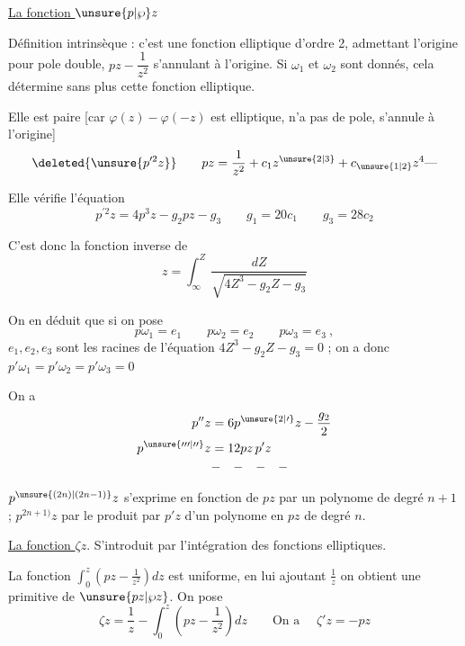 \uline{La fonction $\unsure{p|\wp}z$}

Définition intrinsèque : c'est une fonction elliptique d'ordre 2, admettant l'origine pour pole double,   $pz-\dfrac{1}{z^2}$ s'annulant à l'origine. Si $\omega_1$ et $\omega_2$ sont donnés, cela détermine sans plus cette fonction elliptique.

Elle est paire [car $\varphi(z)-\varphi(-z)$ est elliptique, n'a pas de pole, s'annule à l'origine]  
\[
\deleted{\unsure{p^{\prime2}z}}\qquad
pz=\frac1{z^2}+c_1z^{\unsure{2|3}}+c_{\unsure{1|2}}z^4\mathord{\text{---}}
\]

Elle vérifie l'équation
\[
p^{\prime 2}z=4p^3z-g_2pz-g_3\qquad
g_1=20c_1\qquad g_3=28c_2
\]

C'est donc la fonction inverse de
\[
z=\int_\infty^Z\frac{dZ}{\sqrt{4Z^3-g_2Z-g_3}}
\]

On en déduit que si on pose
\[
p\omega_1=e_1\qquad p\omega_2=e_2\qquad p\omega_3=e_3\ ,
\]
$e_1,e_2,e_3$ sont les racines de l'équation $4Z^3-g_2Z-g_3=0$ ; on a donc $p'\omega_1=p'\omega_2=p'\omega_3=0$

On a 
\[
\begin{aligned}
p''z&=6p^{\unsure{2|\prime}}z-\frac{g_2}{2}\\
p^{\unsure{\prime\prime\prime|\prime\prime}}z&=12pz\,p'z\\
&\mathord{-}\quad\mathord{-}\quad\mathord{-}\quad\mathord{-}
\end{aligned}
\]

$p^{\unsure{(2n)|(2n-1)}}z$ s'exprime en fonction de $pz$ par un polynome de degré $n+1$ ; $p^{2n+1)}z$ par le produit par $p'z$ d'un polynome en $pz$ de degré $n$.


\uline{La fonction $\zeta z$}. S'introduit par l'intégration des fonctions elliptiques.

La fonction $\int_0^z(pz-\frac1{z^2})dz$ est uniforme, en lui ajoutant $\frac1z$ on obtient une primitive de $\unsure{pz|\wp z}$. On pose
\[
\zeta z=\frac1z-\int_0^z(pz-\frac1{z^2})dz\qquad\text{On a }\quad\zeta'z=-pz
\]
